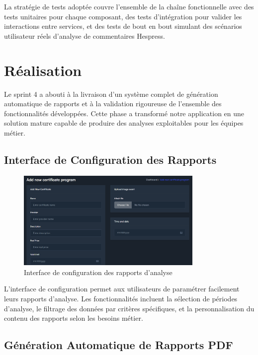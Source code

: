 La stratégie de tests adoptée couvre l'ensemble de la chaîne fonctionnelle avec des tests unitaires pour chaque composant, des tests d'intégration pour valider les interactions entre services, et des tests de bout en bout simulant des scénarios utilisateur réels d'analyse de commentaires Hespress.

\section{Réalisation}

Le sprint 4 a abouti à la livraison d'un système complet de génération automatique de rapports et à la validation rigoureuse de l'ensemble des fonctionnalités développées. Cette phase a transformé notre application en une solution mature capable de produire des analyses exploitables pour les équipes métier.

\subsection{Interface de Configuration des Rapports}

\begin{figure}[H]
\centering
\includegraphics[width=0.8\textwidth]{assets/images/admin-add-certif.png}
\caption{Interface de configuration des rapports d'analyse}
\label{fig:reports-config-interface}
\end{figure}

L'interface de configuration permet aux utilisateurs de paramétrer facilement leurs rapports d'analyse. Les fonctionnalités incluent la sélection de périodes d'analyse, le filtrage des données par critères spécifiques, et la personnalisation du contenu des rapports selon les besoins métier.

\subsection{Génération Automatique de Rapports PDF}


